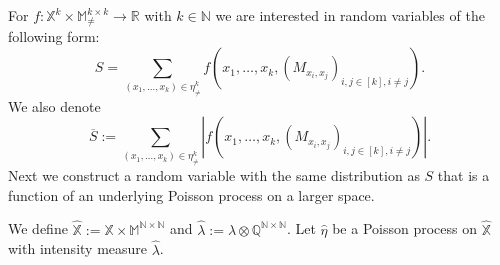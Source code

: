 \documentclass{article}
\theoremstyle{definition}
\numberwithin{equation}{section}
\theoremstyle{remark}
\begin{document}
For $f: \mathbb{X}^k\times \mathbb{M}^{k\times k}_{\neq}\to\mathbb{R}$ with $k\in\mathbb{N}$ we are interested in random variables of the following form:
\begin{equation}\label{def:ustat}
S=\sum_{(x_1,\ldots,x_k)\in\eta^k_{\neq}} f(x_1,\ldots,x_k, (M_{x_i,x_j})_{i,j\in[k], i\neq j}).
\end{equation}
We also denote 
\begin{equation}\label{def-integ1}
    \overline{S}:=\sum_{(x_1,\ldots,x_k)\in\eta^k_{\neq}} \left|f(x_1,\ldots,x_k, (M_{x_i,x_j})_{i,j\in[k], i\neq j})\right|.
\end{equation}
\fi
Next we construct a random variable with the same distribution as $S$ that is a function of an underlying Poisson process on a larger space. 

We define $\widehat{\mathbb{X}}:=\mathbb{X}\times \mathbb{M}^{\mathbb{N}\times\mathbb{N}}$ and $\widehat{\lambda}:=\lambda\otimes \mathbb{Q}^{\mathbb{N}\times\mathbb{N}}$. Let $\widehat{\eta}$ be a Poisson process on $\widehat{\mathbb{X}}$ with intensity measure $\widehat{\lambda}$.
\end{document}
